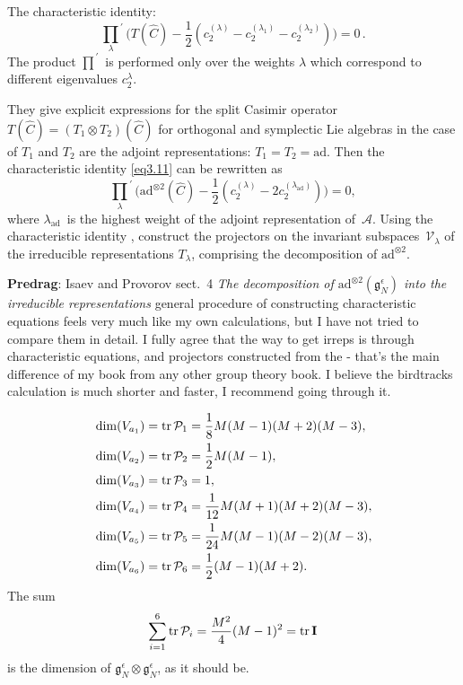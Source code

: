 \begin{description}
The characteristic identity:
\begin{equation}
\label{eq3.11}
{\prod_{\lambda}}^{\, \prime} \biggl(T(\widehat{C})-\frac{1}{2}
(c_2^{(\lambda)} -c_2^{(\lambda_1)}
-c_2^{(\lambda_2)})\biggr) = 0
\,.
\end{equation}
The product ${\prod}^{\, \prime}$ is performed only over the weights
$\lambda$  which correspond to different eigenvalues $c_2^\lambda$.

They give explicit expressions for the split
Casimir operator $T(\widehat{C} )=(T_1\otimes T_2)(\widehat{C} )$ for
orthogonal and symplectic Lie algebras in the case of $T_1$ and
$T_2$ are the adjoint representations: $T_1 = T_2 = \mathrm{ad}$. Then
the characteristic identity \eqref{eq3.11} can be rewritten as
\begin{equation}
\label{eq3.12}
{\prod_{\lambda}}^{\, \prime}
\biggl(\mathrm{ad}^{\otimes 2}(\widehat{C})-\frac{1}{2}(c_2^{(\lambda)}-2c_2^{(\lambda_{\mathrm{ad}})})\biggr)=0,
\end{equation}
where $\lambda_{\mathrm{ad}}$~is the highest weight of the adjoint
representation of~$\mathcal{A}$. Using the characteristic
identity , construct
the projectors on the invariant
subspaces~$\mathcal{V}_\lambda$ of the irreducible representations
$T_\lambda$, comprising the decomposition of $\mathrm{ad}^{\otimes 2}$.

{\bf Predrag}: Isaev and Provorov sect.~4  {\em The decomposition of
$\mathrm{ad}^{\otimes 2}(\mathfrak{g}_N^\epsilon)$ into the irreducible
representations} general procedure of constructing characteristic
equations feels very much like my own calculations, but I have not tried
to compare them in detail. I fully agree that the way to get irreps is
through characteristic equations, and projectors constructed from the -
that's the main difference of my book from any other group theory book. I
believe the birdtracks calculation is much shorter and faster, I
recommend going through it.

\begin{equation}
\label{eq4.32}
\begin{aligned}
&\dim(V_{a_1})=\mathrm{tr}\, \mathcal{P}_1=\frac{1}{8}M(M-1)(M+2)(M-3),\\
&\dim(V_{a_2})=\mathrm{tr}\, \mathcal{P}_2=\frac{1}{2}M(M-1),\\
&\dim(V_{a_3})=\mathrm{tr}\, \mathcal{P}_3=1,\\
&\dim(V_{a_4})=\mathrm{tr}\, \mathcal{P}_4=\frac{1}{12}M(M+1)(M+2)(M-3),\\
&\dim(V_{a_5})=\mathrm{tr}\, \mathcal{P}_5=\frac{1}{24}M(M-1)(M-2)(M-3),\\
&\dim(V_{a_6})=\mathrm{tr}\, \mathcal{P}_6=\frac{1}{2}(M-1)(M+2).
\end{aligned}
\end{equation}
The sum
\begin{equation}
\label{eq4.33}
\sum_{i=1}^6\mathrm{tr}\,\mathcal{P}_i=\frac{M^2}{4}(M-1)^2=\mathrm{tr}\, \mathbf{I}
\end{equation}
is the dimension of $\mathfrak{g}_N^\epsilon\otimes \mathfrak{g}_N^\epsilon$,
as it should be.


\end{description}
